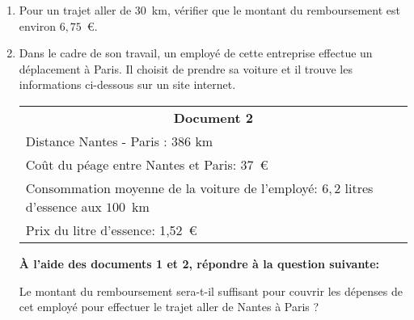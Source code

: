\begin{enumerate}
\item Pour un \og trajet aller\fg{} de 30~km, vérifier que le montant du remboursement est environ $6,75$~\euro.
\item  Dans le cadre de son travail, un employé de cette entreprise effectue un déplacement à Paris. Il choisit de prendre sa voiture et il trouve les informations ci-dessous sur un site internet.

\begin{center}
\begin{tabularx}{\linewidth}{|X|}\hline
\multicolumn{1}{|c|}{\textbf{Document 2}}\\
Distance Nantes - Paris : 386 km\\
Coût du péage entre Nantes et Paris: 37~\euro\\
Consommation moyenne de la voiture de l'employé: $6,2$ litres d'essence aux $100$~km\\
Prix du litre d'essence: 1,52~\euro\\\hline
\end{tabularx}
\end{center}

\textbf{À l'aide des documents 1 et 2, répondre à la question suivante:}

\og Le montant du remboursement sera-t-il suffisant pour couvrir les dépenses de cet
employé pour effectuer le \og trajet aller\fg{} de Nantes à Paris ? \fg
\end{enumerate}

\vspace{0,5cm}

